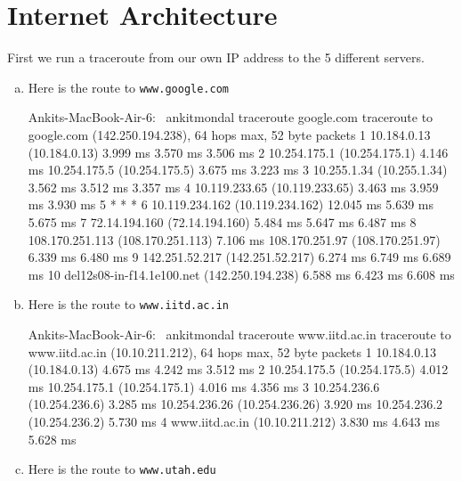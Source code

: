 \section{Internet Architecture}

First we run a traceroute from our own IP address to the 5 different servers.

\begin{enumerate}[a.]

\item Here is the route to {\tt www.google.com}
\begin{code}
Ankits-MacBook-Air-6:~ ankitmondal traceroute google.com
traceroute to google.com (142.250.194.238), 64 hops max, 52 byte packets
 1  10.184.0.13 (10.184.0.13)  3.999 ms  3.570 ms  3.506 ms
 2  10.254.175.1 (10.254.175.1)  4.146 ms
    10.254.175.5 (10.254.175.5)  3.675 ms  3.223 ms
 3  10.255.1.34 (10.255.1.34)  3.562 ms  3.512 ms  3.357 ms
 4  10.119.233.65 (10.119.233.65)  3.463 ms  3.959 ms  3.930 ms
 5  * * *
 6  10.119.234.162 (10.119.234.162)  12.045 ms  5.639 ms  5.675 ms
 7  72.14.194.160 (72.14.194.160)  5.484 ms  5.647 ms  6.487 ms
 8  108.170.251.113 (108.170.251.113)  7.106 ms
    108.170.251.97 (108.170.251.97)  6.339 ms  6.480 ms
 9  142.251.52.217 (142.251.52.217)  6.274 ms  6.749 ms  6.689 ms
10  del12s08-in-f14.1e100.net (142.250.194.238)  6.588 ms  6.423 ms  6.608 ms
\end{code}

\item Here is the route to {\tt www.iitd.ac.in}
\begin{code}
Ankits-MacBook-Air-6:~ ankitmondal traceroute www.iitd.ac.in
traceroute to www.iitd.ac.in (10.10.211.212), 64 hops max, 52 byte packets
 1  10.184.0.13 (10.184.0.13)  4.675 ms  4.242 ms  3.512 ms
 2  10.254.175.5 (10.254.175.5)  4.012 ms
    10.254.175.1 (10.254.175.1)  4.016 ms  4.356 ms
 3  10.254.236.6 (10.254.236.6)  3.285 ms
    10.254.236.26 (10.254.236.26)  3.920 ms
    10.254.236.2 (10.254.236.2)  5.730 ms
 4  www.iitd.ac.in (10.10.211.212)  3.830 ms  4.643 ms  5.628 ms
 \end{code}
 \item Here is the route to {\tt www.utah.edu}
 

\end{enumerate}

